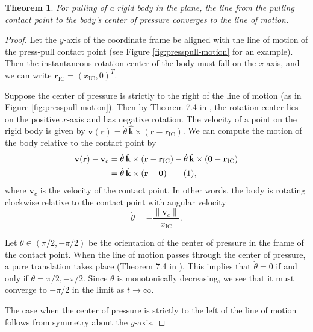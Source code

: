 \documentclass[conference]{IEEEtran}
\newtheorem{theorem}{Theorem}
\newcommand\numberthis{\addtocounter{equation}{1}\tag{\theequation}}
\begin{document}
\begin{theorem}
  For pulling of a rigid body in the plane, the line from the pulling
  contact point to the body's center of pressure converges to the line
  of motion.
\end{theorem}

\begin{proof}
  Let the $y$-axis of the coordinate frame be aligned with the line of
  motion of the press-pull contact point (see Figure
  \ref{fig:presspull-motion} for an example). Then the instantaneous
  rotation center of the body must fall on the $x$-axis, and we can
  write $\mathbf{r}_\text{IC} = (x_\text{IC},0)^T$.

  Suppose the center of pressure is strictly to the right of the line
  of motion (as in Figure \ref{fig:presspull-motion}). Then by Theorem
  7.4 in \cite{Mason}, the rotation center lies on the positive
  $x$-axis and has negative rotation. The velocity of a point on the
  rigid body is given by
  $\mathbf{v}(\mathbf{r}) =
  \dot{\theta}\,\hat{\mathbf{k}}\times(\mathbf{r} -
  \mathbf{r}_\text{IC})$.
  We can compute the motion of the body relative to the contact point
  by
  \begin{align*}
    \mathbf{v}(\mathbf{r}) - \mathbf{v}_c &= \dot{\theta}\,\hat{\mathbf{k}}\times(\mathbf{r} - \mathbf{r}_\text{IC}) - \dot{\theta}\,\hat{\mathbf{k}}\times(\mathbf{0} - \mathbf{r}_\text{IC}) \\
    &= \dot{\theta}\,\hat{\mathbf{k}}\times(\mathbf{r} - \mathbf{0}) \numberthis \label{eqn:rel-rotation-center},
  \end{align*}
  where $\mathbf{v}_c$ is the velocity of the contact point. In other
  words, the body is rotating clockwise relative to the
  contact point with angular velocity
  \begin{equation}
    \dot{\theta} = -\frac{\lVert\mathbf{v}_c\rVert}{x_\text{IC}}.
  \end{equation}

  Let $\theta \in (\pi/2, -\pi/2)$ be the orientation of the center of
  pressure in the frame of the contact point. When the line of motion
  passes through the center of pressure, a pure translation takes
  place (Theorem 7.4 in \cite{Mason}). This implies that
  $\dot{\theta} = 0$ if and only if $\theta = \pi/2, -\pi/2$. Since
  $\theta$ is monotonically decreasing, we see that it must converge
  to $-\pi/2$ in the limit as $t \rightarrow \infty$.

  The case when the center of pressure is strictly to the left of the
  line of motion follows from symmetry about the $y$-axis.
\end{proof}
\end{document}
